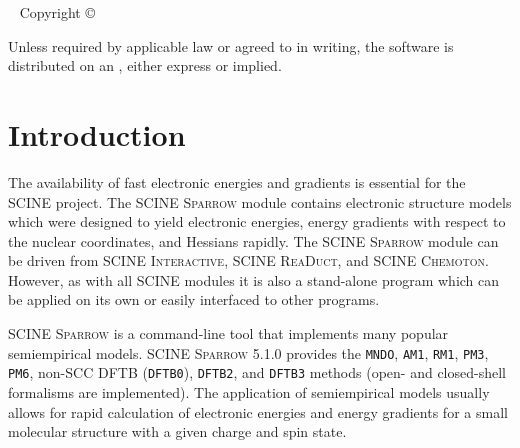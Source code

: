 \documentclass[]{tufte-book}
\title[SCINE Sparrow manual]{User Manual \vskip 0.5em {\setlength{\parindent}{0pt} \Huge SCINE Sparrow 5.1.0}}
\author[The SCINE Sparrow Developers]{The SCINE Sparrow Developers: \newline \noindent Francesco Bosia, Tamara Husch, Charlotte H.~M\"uller, Severin Polonius, Jan-Grimo Sobez, Miguel Steiner, Jan P.~Unsleber, Alain C.~Vaucher, Thomas Weymuth, and Markus Reiher}
\newcommand{\monthyear}{%
  \ifcase\month\or January\or February\or March\or April\or May\or June\or
  July\or August\or September\or October\or November\or
  December\fi\space\number\year
}
\begin{document}
\setlength{\parindent}{0pt}

\frontmatter


\maketitle


\newpage
\begin{fullwidth}
~\vfill
\thispagestyle{empty}
\setlength{\parindent}{0pt}
\setlength{\parskip}{\baselineskip}
Copyright \copyright\ \the\year\ \thanklessauthor


\par{}

\par Unless required by applicable law or agreed to in writing, the software 
is distributed on an , either express or implied. 

\end{fullwidth}

\tableofcontents




\mainmatter

\let\cleardoublepage\clearpage
\chapter{Introduction}

The availability of fast electronic energies and gradients is essential for the SCINE project. The SCINE \textsc{Sparrow} 
module contains electronic structure models which were designed to yield electronic energies, energy gradients with 
respect to the nuclear coordinates, and Hessians rapidly. The SCINE \textsc{Sparrow} module can be driven from SCINE 
\textsc{Interactive}, SCINE \textsc{ReaDuct}, and SCINE \textsc{Chemoton}. However, as with all SCINE modules it is also 
a stand-alone program which can be applied on its own or easily interfaced to other programs.

SCINE \textsc{Sparrow} is a command-line tool that implements many popular semiempirical models. SCINE \textsc{Sparrow} 5.1.0
provides the \texttt{MNDO}, \texttt{AM1}, \texttt{RM1}, \texttt{PM3}, \texttt{PM6}, non-SCC DFTB (\texttt{DFTB0}), \texttt{DFTB2}, and \texttt{DFTB3} methods 
(open- and closed-shell formalisms are implemented). 
The application of semiempirical models usually allows for rapid calculation of electronic energies and energy gradients 
for a small molecular structure with a given charge and spin state.
\end{document}
